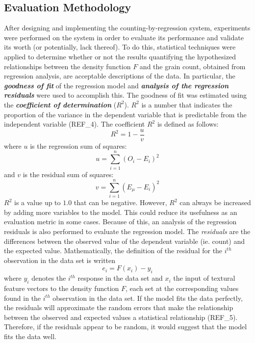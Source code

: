 \subsection{Evaluation Methodology}
After designing and implementing the counting-by-regression system, experiments were performed on the system in order to evaluate its performance and validate its worth (or potentially, lack thereof). To do this, statistical techniques were applied to determine whether or not the results quantifying the hypothesized relationships between the density function $F$ and the grain count, obtained from regression analysis, are acceptable descriptions of the data. In particular, the \textit{\textbf{goodness of fit}} of the regression model and \textit{\textbf{analysis of the regression residuals}} were used to accomplish this. The goodness of fit was estimated using the \textbf{\textit{coefficient of determination}} ($R^2$). $R^2$ is a number that indicates the proportion of the variance in the dependent variable that is predictable from the independent variable (REF\_4). The coefficient $R^2$ is defined as follows:
\begin{equation}
R^2 = 1 - \frac{u}{v}
\end{equation}
where $u$ is the regression sum of squares:
\begin{equation}
u = \sum_{i = 1}^{n} (O_i - E_i)^2 
\end{equation}
and $v$ is the residual sum of squares:
\begin{equation}
v = \sum_{i = 1}^{n} (E_\mu - E_i)^2 
\end{equation}
$R^2$ is a value up to $1.0$ that can be negative. However, $R^2$ can always be increased by adding more variables to the model. This could reduce its usefulness as an evaluation metric in some cases. Because of this, an analysis of the regression residuals is also performed to evaluate the regression model. The \textit{residuals} are the differences between the observed value of the dependent variable (ie. count) and the expected value. Mathematically, the definition of the residual for the $i^{th}$ observation in the data set is written
\begin{equation}
e_i = F(x_i) - y_i 
\end{equation}
where $y_i$ denotes the $i^{th}$ response in the data set and $x_i$ the input of textural feature vectors to the density function $F$, each set at the corresponding values found in the $i^{th}$ observation in the data set. If the model fits the data perfectly, the residuals will approximate the random errors that make the relationship between the observed and expected values a statistical relationship (REF\_5). Therefore, if the residuals appear to be random, it would suggest that the model fits the data well.

